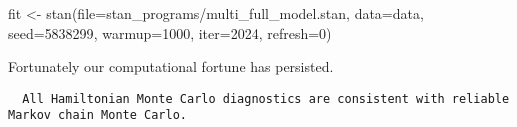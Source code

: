 \documentclass[
  letterpaper,
  DIV=11,
  numbers=noendperiod]{scrartcl}
\newenvironment{Shaded}{\begin{snugshade}}{\end{snugshade}}
\newcommand{\AttributeTok}[1]{\textcolor[rgb]{0.40,0.45,0.13}{#1}}
\newcommand{\ConstantTok}[1]{\textcolor[rgb]{0.56,0.35,0.01}{#1}}
\newcommand{\DecValTok}[1]{\textcolor[rgb]{0.68,0.00,0.00}{#1}}
\newcommand{\FunctionTok}[1]{\textcolor[rgb]{0.28,0.35,0.67}{#1}}
\newcommand{\NormalTok}[1]{\textcolor[rgb]{0.00,0.23,0.31}{#1}}
\newcommand{\OtherTok}[1]{\textcolor[rgb]{0.00,0.23,0.31}{#1}}
\newcommand{\SpecialCharTok}[1]{\textcolor[rgb]{0.37,0.37,0.37}{#1}}
\newcommand{\StringTok}[1]{\textcolor[rgb]{0.13,0.47,0.30}{#1}}
\begin{document}
\begin{Shaded}
\begin{Highlighting}[]
\NormalTok{fit }\OtherTok{\textless{}{-}} \FunctionTok{stan}\NormalTok{(}\AttributeTok{file=}\StringTok{\textquotesingle{}stan\_programs/multi\_full\_model.stan\textquotesingle{}}\NormalTok{,}
            \AttributeTok{data=}\NormalTok{data, }\AttributeTok{seed=}\DecValTok{5838299}\NormalTok{,}
            \AttributeTok{warmup=}\DecValTok{1000}\NormalTok{, }\AttributeTok{iter=}\DecValTok{2024}\NormalTok{, }\AttributeTok{refresh=}\DecValTok{0}\NormalTok{)}
\end{Highlighting}
\end{Shaded}

Fortunately our computational fortune has persisted.

\begin{Shaded}
\end{Shaded}

\begin{verbatim}
  All Hamiltonian Monte Carlo diagnostics are consistent with reliable
Markov chain Monte Carlo.
\end{verbatim}

\begin{Shaded}
\end{Shaded}
\end{document}
